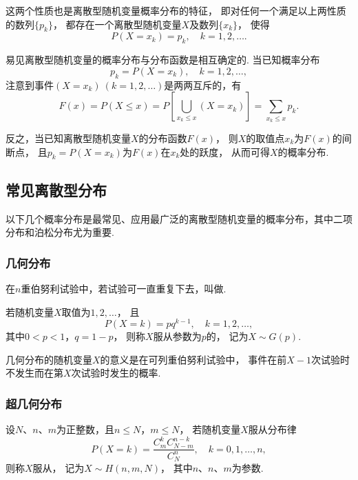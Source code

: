 这两个性质也是离散型随机变量概率分布的特征，
即对任何一个满足以上两性质的数列\(\{p_k\}\)，
都存在一个离散型随机变量\(X\)及数列\(\{x_k\}\)，
使得\begin{equation*}
	P(X=x_k) = p_k,
	\quad k=1,2,\dotsc.
\end{equation*}

易见离散型随机变量的概率分布与分布函数是相互确定的.
当已知概率分布\begin{equation*}
	p_k = P(X=x_k),
	\quad k=1,2,\dotsc,
\end{equation*}
注意到事件\((X=x_k)\ (k=1,2,\dotsc)\)是两两互斥的，有\begin{equation}
	F(x) = P(X \leq x)
	= P\left[ \bigcup_{x_k \leq x} (X = x_k) \right]
	= \sum_{x_k \leq x} p_k.
\end{equation}

反之，当已知离散型随机变量\(X\)的分布函数\(F(x)\)，
则\(X\)的取值点\(x_k\)为\(F(x)\)的间断点，
且\(p_k = P(X=x_k)\)为\(F(x)\)在\(x_k\)处的跃度，
从而可得\(X\)的概率分布.

\subsection{常见离散型分布}

以下几个概率分布是最常见、应用最广泛的离散型随机变量的概率分布，其中二项分布和泊松分布尤为重要.

\subsubsection{几何分布}
\begin{definition}
在\(n\)重伯努利试验中，若试验可一直重复下去，叫做.
\end{definition}

\begin{definition}
若随机变量\(X\)取值为\(1,2,\dotsc\)，
且\begin{equation}\label{equation:离散型分布.几何分布的分布律}
	P(X=k) = p q^{k-1}, \quad k=1,2,\dotsc,
\end{equation}其中\(0 < p < 1\)，\(q = 1-p\)，
则称\(X\)服从参数为\(p\)的，
记为\(X \sim G(p)\).
\end{definition}

几何分布的随机变量\(X\)的意义是在可列重伯努利试验中，
事件在前\(X-1\)次试验时不发生而在第\(X\)次试验时发生的概率.

\subsubsection{超几何分布}
\begin{definition}
设\(N\)、\(n\)、\(m\)为正整数，且\(n \leq N\)，\(m \leq N\)，
若随机变量\(X\)服从分布律\begin{equation}\label{equation:离散型分布.超几何分布的分布律}
	P(X=k) = \frac{C_m^k C_{N-m}^{n-k}}{C_N^n}, \quad k=0,1,\dotsc,n,
\end{equation}
则称\(X\)服从，
记为\(X \sim H(n,m,N)\)，
其中\(n\)、\(n\)、\(m\)为参数.
\end{definition}

